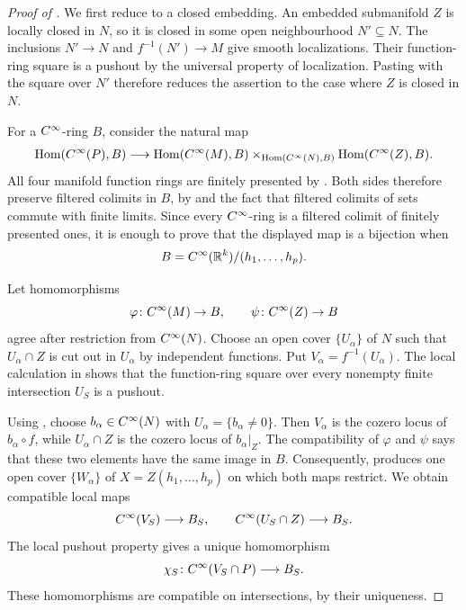 \begin{proof}[Proof of ]
  We first reduce to a closed embedding. An embedded submanifold $Z$
  is locally closed in $N$, so it is closed in some open neighbourhood
  $N'\subseteq N$. The inclusions $N'\to N$ and $f^{-1}(N')\to M$
  give smooth localizations. Their function-ring square is a pushout
  by the universal property of localization. Pasting with the square
  over $N'$ therefore reduces the assertion to the case where $Z$
  is closed in $N$.


  For a $C^\infty$-ring $B$, consider the natural map
  \begin{align*}
    \operatorname{Hom}(C^\infty(P),B)
    \longrightarrow
    \operatorname{Hom}(C^\infty(M),B)
    \mathbin{\times_{\operatorname{Hom}(C^\infty(N),B)}}
    \operatorname{Hom}(C^\infty(Z),B).
  \end{align*}
  All four manifold function rings are finitely presented by
  . Both sides therefore
  preserve filtered colimits in $B$, by
   and the fact that filtered colimits of
  sets commute with finite limits. Since every $C^\infty$-ring is a filtered
  colimit of finitely presented ones, it is enough to prove that the displayed
  map is a bijection when
  \[
    B=C^\infty(\mathbb{R}^k)/(h_1,\ldots,h_p).
  \]

  Let homomorphisms
  \[
    \varphi\colon C^\infty(M)\to B,
    \qquad
    \psi\colon C^\infty(Z)\to B
  \]
  agree after restriction from $C^\infty(N)$. Choose an open cover
  $\{U_\alpha\}$ of $N$ such that $U_\alpha\cap Z$ is cut out in $U_\alpha$
  by independent functions. Put $V_\alpha=f^{-1}(U_\alpha)$. The local
  calculation in  shows that the
  function-ring square over every nonempty finite intersection $U_S$ is a
  pushout.

  Using , choose $b_\alpha\in C^\infty(N)$ with
  $U_\alpha=\{b_\alpha\neq0\}$. Then $V_\alpha$ is the cozero locus of
  $b_\alpha\circ f$, while $U_\alpha\cap Z$ is the cozero locus of
  $b_\alpha|_Z$. The compatibility of $\varphi$ and $\psi$ says that these two
  elements have the same image in $B$. Consequently,
   produces one open cover
  $\{W_\alpha\}$ of $X=Z(h_1,\ldots,h_p)$ on which both maps restrict. We
  obtain compatible
  local maps
  \[
    C^\infty(V_S)\longrightarrow B_S,
    \qquad
    C^\infty(U_S\cap Z)\longrightarrow B_S.
  \]
  The local pushout property gives a unique homomorphism
  \[
    \chi_S\colon C^\infty(V_S\cap P)\longrightarrow B_S.
  \]
  These homomorphisms are compatible on intersections, by their uniqueness.


\end{proof}
